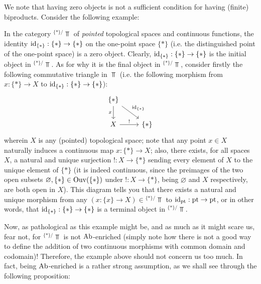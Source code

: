                     We note that having zero objects is not a sufficient condition for having (finite) biproducts. Consider the following example:
                    \begin{example} \label{example: zero_objects_do_not_imply_biproducts}
                        In the category ${}^{\{*\}/}\Top$ of \textit{pointed} topological spaces and continuous functions, the identity $\mathrm{id}_{\{*\}}: \{*\} \to \{*\}$ on the one-point space $\{*\}$ (i.e. the distinguished point of the one-point space) is a zero object. Clearly, $\mathrm{id}_{\{*\}}: \{*\} \to \{*\}$ is the initial object in ${}^{\{*\}/}\Top$. As for why it is the final object in ${}^{\{*\}/}\Top$, consider firstly the following commutative triangle in $\Top$ (i.e. the following morphism from $x: \{*\} \to X$ to $\mathrm{id}_{\{*\}}: \{*\} \to \{*\}$):
                            $$
                                \begin{tikzcd}
                                	\{*\} \\
                                	X & \{*\}
                                	\arrow["x"', from=1-1, to=2-1]
                                	\arrow["{\id_{\{*\}}}", from=1-1, to=2-2]
                                	\arrow["{!}", from=2-1, to=2-2]
                                \end{tikzcd}
                            $$
                        wherein $X$ is any (pointed) topological space; note that any point $x \in X$ naturally induces a continuous map $x: \{*\} \to X$; also, there exists, for all spaces $X$, a natural and unique surjection $!: X \to \{*\}$ sending every element of $X$ to the unique element of $\{*\}$ (it is indeed continuous, since the preimages of the two open subsets $\varnothing, \{*\} \in \mathrm{Ouv}(\{*\})$ under $!: X \to \{*\}$, being $\varnothing$ and $X$ respectively, are both open in $X$). This diagram tells you that there exists a natural and unique morphism from any $(x: \{x\} \to X) \in {}^{\{*\}/}\Top$ to $\mathrm{id}_{\mathrm{pt}}: \mathrm{pt} \to \mathrm{pt}$, or in other words, that $\mathrm{id}_{\{*\}}: \{*\} \to \{*\}$ is a terminal object in ${}^{\{*\}/}\Top$. 
                    \end{example}
                    Now, as pathological as this example might be, and as much as it might scare us, fear not, for ${}^{\{*\}/}\Top$ is not $\mathrm{Ab}$-enriched (simply note how there is not a good way to define the addition of two continuous morphisms with common domain and codomain)! Therefore, the example above should not concern us too much. In fact, being $\mathrm{Ab}$-enriched is a rather strong assumption, as we shall see through the following proposition:
